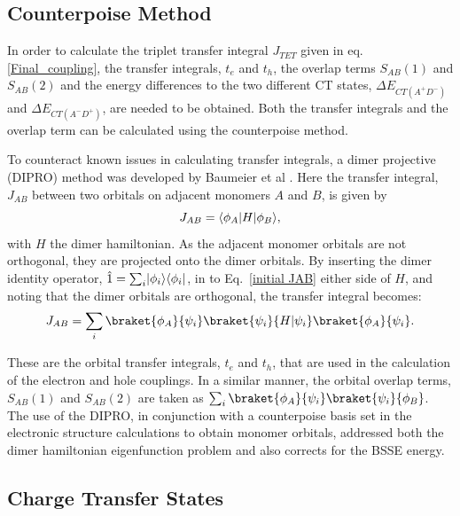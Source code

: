\documentclass[aps,physrev,reprint,superscriptaddress,nofootinbib,amsmath,amssymb,a4paper]{revtex4-2}
\DeclarePairedDelimiter\bra{\langle}{\rvert}
\DeclarePairedDelimiter\ket{\lvert}{\rangle}
\begin{document}
\subsection{Counterpoise Method}

In order to calculate the triplet transfer integral $J_{TET}$ given in eq. \ref{Final_coupling},  the transfer integrals,  $t_e$ and $t_h$,  the overlap terms $S_{AB}(1)$ and $S_{AB}(2)$ and the energy differences to the two different CT states,  $\Delta E_{CT(A^+D^-)}$ and  $\Delta E_{CT(A^-D^+)}$, are needed to be obtained. Both the transfer integrals and the overlap term can be calculated using the counterpoise method. 

 To counteract known issues in calculating transfer integrals, a dimer projective (DIPRO) method was developed by Baumeier et al \cite{Baumeier2010}. Here the transfer integral, $J_{AB}$ between two orbitals on adjacent monomers $A$ and $B$, is given by 
\begin{equation}\label{initial JAB}
    J_{AB} = \bra{\phi_A}H\ket{\phi_B}, 
\end{equation}
 with $H$  the dimer hamiltonian. As the adjacent monomer orbitals are not orthogonal, they are projected onto the dimer orbitals. By inserting the dimer identity operator, $\hat{1}= \sum_i\ket{\phi_i}\bra{\phi_i}$, in to Eq.\ \eqref{initial JAB} either side of $H$, and noting that the dimer orbitals are orthogonal, the transfer integral becomes:
\begin{equation}\label{initial JAB}
    J_{AB} = \sum_i \braket{\phi_A}{\psi_i}\braket{\psi_i}{H|\psi_i}\braket{\phi_A}{\psi_i} . 
\end{equation}

These are the orbital transfer integrals, $t_e$ and $t_h$, that are used in the calculation of the electron and hole couplings. In a similar manner, the orbital overlap terms, $S_{AB}(1)$ and $S_{AB}(2)$ are taken as $\sum_i\braket{\phi_A }{\psi_i}\braket{\psi_i}{\phi_B}$. The use of the DIPRO, in conjunction with a counterpoise basis set in the electronic structure calculations to obtain monomer orbitals, addressed both the dimer hamiltonian eigenfunction problem and also corrects for the BSSE energy\cite{Baumeier2010}.

\subsection{Charge Transfer States}
\end{document}
